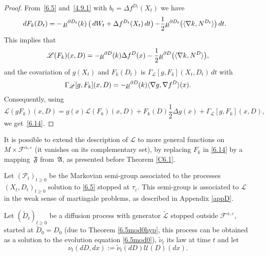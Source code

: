 \documentclass[JEP,XML,SOM,Unicode,NoFloatCountersInSection,published]{cedram}
\theoremstyle{plain}
\theoremstyle{definition}
\newcommand{\SL}{{\mathscr L}}
\newcommand{\SP}{{\mathscr P}}
\newcommand{\SU}{{\mathscr U}}
\newcommand{\usm}{{\underline{\smash{\mu}}}}
\let\f\frac
\let\a\alpha
\let\D\Delta
\let\e\varepsilon
\let\n\nabla
\let\wi\widetilde
\newcommand{\cF}{\mathcal{F}}
\newcommand{\fA}{\mathfrak{A}}
\newcommand{\fF}{\mathfrak{F}}
\begin{document}
\begin{proof}
From~\eqref{6.5} and~\eqref{4.9.1} with $b_t=\D f^{D_t}(X_t)$ we have
\begin{equation}
\begin{split}
dF_k(D_t)=&-\usm^{\partial D_t}(k)\left(\,dW_t +\D f^{D_t}(X_t)\,dt\right){-}\f12\usm^{\partial D_t}\bigl(\langle \n k,N^{D_t}\rangle \bigr)\,dt.
\end{split}
\end{equation}
This implies that
\begin{equation}
\SL(F_k)(x,D)=-\usm^{\partial D}(k)\D f^D(x)-\f12\usm^{\partial D}\bigl(\langle \n k,N^{D}\rangle \bigr),
\end{equation}
and the covariation of $g(X_t)$ and $F_k(D_t)$ is $\Gamma_\SL[g,F_k](X_t,D_t)\,dt$ with
\begin{equation}
\Gamma_\SL[g,F_k](x,D)=-\usm^{\partial D}(k)\langle \n g,\n f^D\rangle (x).
\end{equation}
Consequently, using
\begin{equation}
\SL(gF_k)(x,D)= g(x)\SL(F_k)(x,D)+F_k(D)\f12\D g(x)+\Gamma_\SL[g,F_k](x,D),
\end{equation}
we get~\eqref{6.14}.
\end{proof}
\par
It is possible to extend the description of $\SL$ to more general functions on $M\times\cF^{\a,\e}$ (it vanishes on its complementary set), by replacing $F_k$ in \eqref{6.14} by a mapping~$\fF$ from~$\fA$, as presented before Theorem \ref{C6.1}.\par
Let $(\SP_t)_{t\geq 0}$ be the Markovian semi-group associated to the processes $(X_t,D_t)_{t\geq 0}$ solution to \eqref{6.5} stopped at $\tau_\e$.
This semi-group is associated to $\SL$ in the weak sense of martingale problems, as described in Appendix \ref{appD}.
\par
Let $(\wi D_t)_{t\geq 0}$ be a diffusion process with generator $ \wi\SL$ stopped outside $\cF^{\a,\e}$,
started at $\wi D_0=D_0$ (due to Theorem \ref{6.5mod0hyp}, this process can be obtained as a solution to the evolution equation \eqref{6.5mod0}),
$\wi \nu_t$ its law at time $t$ and let
\begin{equation}
\nu_t(dD, dx):=\wi \nu_t(dD)\SU(D)(dx).
\end{equation}
\end{document}
